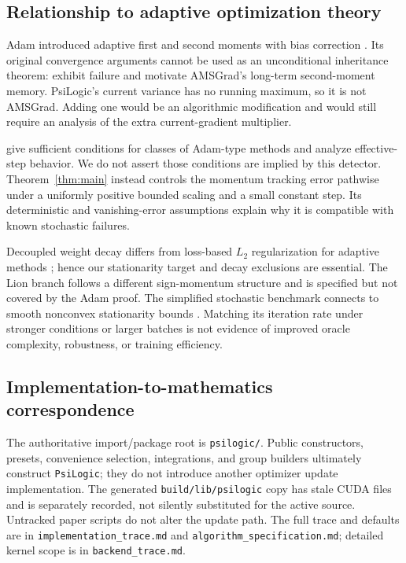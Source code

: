 \documentclass[11pt,a4paper]{article}
\theoremstyle{definition}
\theoremstyle{remark}
\begin{document}
\subsection{Relationship to adaptive optimization theory}\label{sec:related}
Adam introduced adaptive first and second moments with bias correction
\citep{kingma2015adam}. Its original convergence arguments cannot be used as
an unconditional inheritance theorem: \citet{reddi2018convergence} exhibit
failure and motivate AMSGrad's long-term second-moment memory. PsiLogic's
current variance has no running maximum, so it is not AMSGrad. Adding one
would be an algorithmic modification and would still require an analysis of
the extra current-gradient multiplier.

\citet{chen2019adamtype} give sufficient conditions for classes of Adam-type
methods and analyze effective-step behavior. We do not assert those conditions
are implied by this detector. Theorem~\ref{thm:main} instead controls the
momentum tracking error pathwise under a uniformly positive bounded scaling
and a small constant step. Its deterministic and vanishing-error assumptions
explain why it is compatible with known stochastic failures.

Decoupled weight decay differs from loss-based $L_2$ regularization for
adaptive methods \citep{loshchilov2019decoupled}; hence our stationarity target
and decay exclusions are essential. The Lion branch follows a different
sign-momentum structure \citep{chen2023lion} and is specified but not covered
by the Adam proof. The simplified stochastic benchmark connects to smooth
nonconvex stationarity bounds \citep{ghadimi2013stochastic}. Matching its
iteration rate under stronger conditions or larger batches is not evidence
of improved oracle complexity, robustness, or training efficiency.

\subsection{Implementation-to-mathematics correspondence}\label{sec:trace}
The authoritative import/package root is \texttt{psilogic/}. Public
constructors, presets, convenience selection, integrations, and group builders
ultimately construct \texttt{PsiLogic}; they do not introduce another
optimizer update implementation. The generated \texttt{build/lib/psilogic}
copy has stale CUDA files and is separately recorded, not silently substituted
for the active source. Untracked paper scripts do not alter the update path.
The full trace and defaults are in \texttt{implementation\_trace.md} and
\texttt{algorithm\_specification.md}; detailed kernel scope is in
\texttt{backend\_trace.md}.
\end{document}
